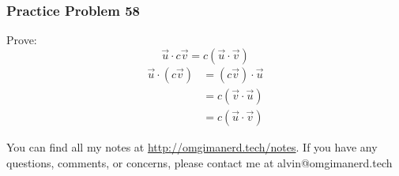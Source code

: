 \documentclass[letterpaper, 12pt]{math}
\begin{document}
\subsubsection*{Practice Problem 58}
Prove:
\[ \vec{u}\cdot c\vec{v} = c(\vec{u}\cdot\vec{v}) \]
\begin{align*}
  \vec{u}\cdot(c\vec{v}) &= (c\vec{v})\cdot\vec{u} \\
  &= c(\vec{v}\cdot\vec{u}) \\
  &= c(\vec{u}\cdot\vec{v})
\end{align*}

\begin{center}
  You can find all my notes at \url{http://omgimanerd.tech/notes}. If you have
  any questions, comments, or concerns, please contact me at
  alvin@omgimanerd.tech
\end{center}
\end{document}
